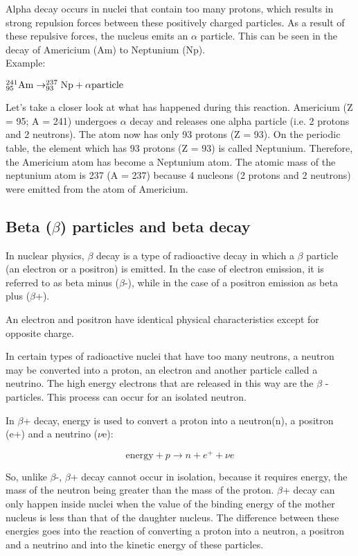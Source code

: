 Alpha decay occurs in nuclei that contain too many protons, which results in strong repulsion forces between these positively charged particles. As a result of these repulsive forces, the nucleus emits an $\alpha$ particle. This can be seen in the decay of Americium (Am) to Neptunium (Np).\\

Example:

\begin{center}
$\rm{^{241}_{95}Am \rightarrow ^{237}_{93}Np + \alpha particle}$
\end{center}

Let's take a closer look at what has happened during this reaction. Americium (Z = 95; A = 241) undergoes $\alpha$ decay and releases one alpha particle (i.e. 2 protons and 2 neutrons). The atom now has only 93 protons (Z = 93). On the periodic table, the element which has 93 protons (Z = 93) is called Neptunium. Therefore, the Americium atom has become a Neptunium atom. The atomic mass of the neptunium atom is 237 (A = 237) because 4 nucleons (2 protons and 2 neutrons) were emitted from the atom of Americium.


\subsection{Beta ($\beta$) particles and beta decay}
In nuclear physics, $\beta$ decay is a type of radioactive decay in which a $\beta$ particle (an electron or a positron) is emitted. In the case of electron emission, it is referred to as beta minus ($\beta$-), while in the case of a positron emission as beta plus ($\beta$+).

An electron and positron have identical physical characteristics except for opposite charge.

In certain types of radioactive nuclei that have too many neutrons, a neutron may be converted into a proton, an electron and another particle called a neutrino. The high energy electrons that are released in this way are the $\beta$ - particles. This process can occur for an isolated neutron.

In $\beta$+ decay, energy is used to convert a proton into a neutron(n), a
positron (e+) and a neutrino ($\nu$e):

\begin{equation*}
 \mbox{energy} + p \rightarrow n + e^+ + {\nu}e
\end{equation*}

So, unlike $\beta$-, $\beta$+ decay cannot occur in isolation, because it requires energy, the mass of the neutron being greater than the mass of the
proton. $\beta$+ decay can only happen inside nuclei when the value of  the binding energy of the mother nucleus is less than that of the daughter
nucleus. The difference between these energies goes into the reaction of
converting a proton into a neutron, a positron and a neutrino and into
the kinetic energy of these particles.
\\

